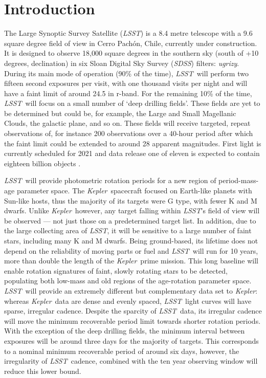 \documentclass[useAMS, usenatbib, preprint, 12pt]{aastex}
\newcommand{\kepler}{{\it Kepler}}
\newcommand{\LSST}{{\it LSST}}
\newcommand{\SDSS}{{\it SDSS}}
\begin{document}
\section{Introduction}

The Large Synoptic Survey Satellite (\LSST) is a 8.4 metre telescope with a
9.6 square degree field of view in Cerro Pach\'{o}n, Chile, currently under
construction.
It is designed to observe 18,000 square degrees in the southern sky (south of
+10 degrees, declination) in six Sloan Digital Sky Survey (\SDSS) filters:
{\it ugrizy}.
During its main mode of operation (90\% of the time), \LSST\ will perform two
fifteen second exposures per visit, with one thousand visits per night and
will have a faint limit of around 24.5 in r-band.
For the remaining 10\% of the time, \LSST\ will focus on a small number of
`deep drilling fields'.
These fields are yet to be determined but could be, for example, the Large and
Small Magellanic Clouds, the galactic plane, and so on.
These fields will receive targeted, repeat observations of, for instance 200
observations over a 40-hour period after which the faint limit could be
extended to around 28 apparent magnitudes.
First light is currently scheduled for 2021 and data release one of eleven is
expected to contain eighteen billion objects \citep{Ivezic2008}.

\LSST\ will provide photometric rotation periods for a new region of
period-mass-age parameter space.
The \kepler\ spacecraft focused on Earth-like planets with Sun-like hosts,
thus the majority of its targets were G type, with fewer K and M dwarfs.
Unlike \kepler\ however, any target falling within \LSST's field of view will
be observed --- not just those on a predetermined target list.
In addition, due to the large collecting area of \LSST, it will be sensitive
to a large number of faint stars, including many K and M dwarfs.
Being ground-based, its lifetime does not depend on the reliability of moving
parts or fuel and \LSST\ will run for 10 years, more than double the length of
the \kepler\ prime mission.
This long baseline will enable rotation signatures of faint, slowly rotating
stars to be detected, populating both low-mass and old regions of the
age-rotation parameter space.
\LSST\ will provide an extremely different but complementary data set to
\kepler: whereas \kepler\ data are dense and evenly spaced, \LSST\ light
curves will have sparse, irregular cadence.
Despite the sparcity of \LSST\ data, its irregular cadence will move the
minimum recoverable period limit towards shorter rotation periods.
With the exception of the deep drilling fields, the minimum interval
between exposures will be around three days for the majority of targets.
This corresponds to a nominal minimum recoverable period of around six days,
however, the irregularity of \LSST\ cadence, combined with the ten year
observing window will reduce this lower bound.
\end{document}
